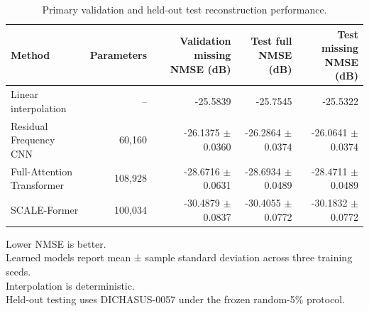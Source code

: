\begin{table}[t]
\centering
\caption{Primary validation and held-out test reconstruction performance.}
\label{tab:primary-performance}
\begin{tabular}{lrrrr}
\hline
Method & Parameters & Validation missing NMSE (dB) & Test full NMSE (dB) & Test missing NMSE (dB) \\
\hline
Linear interpolation & -- & -25.5839 & -25.7545 & -25.5322 \\
Residual Frequency CNN & 60,160 & -26.1375 $\pm$ 0.0360 & -26.2864 $\pm$ 0.0374 & -26.0641 $\pm$ 0.0374 \\
Full-Attention Transformer & 108,928 & -28.6716 $\pm$ 0.0631 & -28.6934 $\pm$ 0.0489 & -28.4711 $\pm$ 0.0489 \\
SCALE-Former & 100,034 & -30.4879 $\pm$ 0.0837 & -30.4055 $\pm$ 0.0772 & -30.1832 $\pm$ 0.0772 \\
\hline
\end{tabular}
\vspace{1mm}
\begin{minipage}{0.98\textwidth}
\footnotesize
Lower NMSE is better.\\
Learned models report mean ± sample standard deviation across three training seeds.\\
Interpolation is deterministic.\\
Held-out testing uses DICHASUS-0057 under the frozen random-5\% protocol.\\
\end{minipage}
\end{table}
